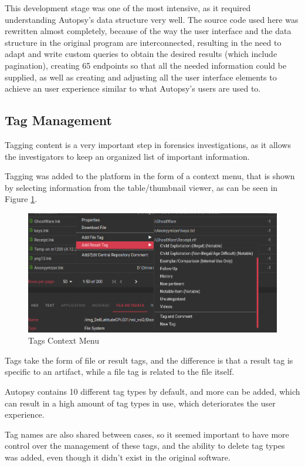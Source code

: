 This development stage was one of the most intensive, as it required understanding Autopsy's data structure very well. The source code used here was rewritten almost completely, 
because of the way the user interface and the data structure in the original program are interconnected, resulting in the need to adapt and write custom queries to obtain the desired results (which include pagination), creating 
65 endpoints so that all the needed information could be supplied, as well as creating and adjusting all the user interface elements to achieve an user experience similar to what Autopsy's users are used to.

\subsection{Tag Management}

Tagging content is a very important step in forensics investigations, as it allows the investigators to keep an organized list of important information.

Tagging was added to the platform in the form of a context menu, that is shown by selecting information from the table/thumbnail viewer, as can be seen in Figure \ref{fig:tags}.

\begin{figure}[ht]
 \centering
 \includegraphics[width=1\linewidth]{imgs/tags.png}
 \caption{Tags Context Menu}
 \label{fig:tags}
\end{figure}

Tags take the form of file or result tags, and the difference is that a result tag is specific to an artifact, while a file tag is related to the file itself.

Autopsy contains 10 different tag types by default, and more can be added, which can result in a high amount of tag types in use, which deteriorates the user experience.

Tag names are also shared between cases, so it seemed important to have more control over the management of these tags, and the ability to delete tag types was added, even though it didn't exist in the original software.

